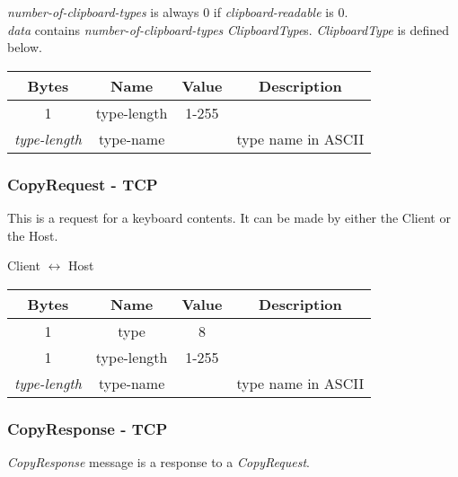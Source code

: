 \emph{number-of-clipboard-types} is always 0 if \emph{clipboard-readable} is 0.\\

\emph{data} contains \emph{number-of-clipboard-types} \emph{ClipboardType}s. \emph{ClipboardType} is defined below.

\begin{center}
    \begin{tabular}{|c|c|c|c|}
        \hline
        \textbf{Bytes}     & \textbf{Name} & \textbf{Value} & \textbf{Description} \\
        \hline
        1                  & type-length   & 1-255          &                      \\
        \hline
        \emph{type-length} & type-name     &                & type name in ASCII   \\
        \hline
    \end{tabular}
\end{center}

\subsubsection{CopyRequest - TCP}

This is a request for a keyboard contents. It can be made by either the Client or the Host.

\begin{center}
    Client $\leftrightarrow$ Host\\
    \begin{tabular}{|c|c|c|c|}
        \hline
        \textbf{Bytes}     & \textbf{Name} & \textbf{Value} & \textbf{Description} \\
        \hline
        1                  & type          & 8              &                      \\
        \hline
        1                  & type-length   & 1-255          &                      \\
        \hline
        \emph{type-length} & type-name     &                & type name in ASCII   \\
        \hline
    \end{tabular}
\end{center}

\subsubsection{CopyResponse - TCP}

\emph{CopyResponse} message is a response to a \emph{CopyRequest}.

